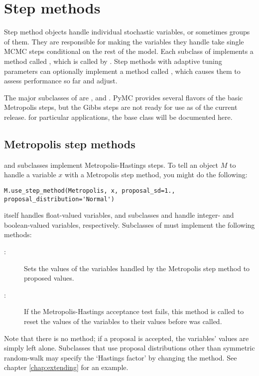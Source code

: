 \hypertarget{step-method}{}
\section{Step methods} \label{sec:stepmethod}


Step method objects handle individual stochastic variables, or sometimes groups of them. They are responsible for making the variables they handle take single MCMC steps conditional on the rest of the model. Each subclass of  implements a method called , which is called by . Step methods with adaptive tuning parameters can optionally implement a method called , which causes them to assess performance so far and adjust.

The major subclasses of  are ,
 and . PyMC provides several flavors of the
basic Metropolis steps, but the Gibbs steps are not ready for use as of the
current release. %
for particular applications, the  base class will be documented
here.

\hypertarget{metropolis}{}
\subsection{Metropolis step methods} \label{metropolis}

 and subclasses implement Metropolis-Hastings steps. To tell an  object $M$ to handle a variable $x$ with a Metropolis step method, you might do the following:
\begin{verbatim}
M.use_step_method(Metropolis, x, proposal_sd=1., proposal_distribution='Normal')
\end{verbatim}

 itself handles float-valued variables, and subclasses  and  handle integer- and boolean-valued variables, respectively. Subclasses of  must implement the following methods:
\begin{description}
    \item[:] Sets the values of the variables handled by the Metropolis step method to proposed values.
    \item[:] If the Metropolis-Hastings acceptance test fails, this method is called to reset the values of the variables to their values before  was called.
\end{description}
Note that there is no  method; if a proposal is accepted, the variables' values are simply left alone. Subclasses that use proposal distributions other than symmetric random-walk may specify the `Hastings factor' by changing the  method. See chapter \ref{chap:extending} for an example.

